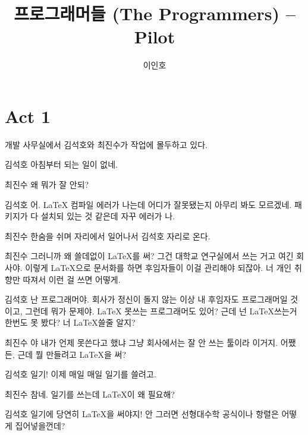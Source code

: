 \documentclass{screenplay}
\title{프로그래머들 (The Programmers) -- Pilot}
\author{이인호}
\begin{document}
    \coverpage
    
    \section{Act 1}
    
    \fadein
    개발 사무실에서 김석호와 최진수가 작업에 몰두하고 있다. 
    \begin{dialogue}[짜증 내는 말투로]{김석호}
        아침부터 되는 일이 없네.
    \end{dialogue}
    \begin{dialogue}{최진수}
        왜 뭐가 잘 안되?
    \end{dialogue}
    \begin{dialogue}{김석호}
        어. LaTeX 컴파일 에러가 나는데 어디가 잘못됐는지 아무리 봐도 모르겠네. 패키지가 다 설치되 있는 것 같은데 자꾸 에러가 나. 
    \end{dialogue}
    최진수 한숨을 쉬며 자리에서 일어나서 김석호 자리로 온다.
    \begin{dialogue}[어이없다는 듯이]{최진수}
        그러니까 왜 쓸데없이 LaTeX를 써? 그건 대학교 연구실에서 쓰는 거고 여긴 회사야. 이렇게 LaTeX으로 문서화를 하면 후임자들이 이걸 관리해야 되잖아. 너 개인 취향만 따져서 이런 걸 쓰면 어떻게. 
    \end{dialogue}
    \begin{dialogue}[반색하며]{김석호}
        난 프로그래머야. 회사가 정신이 돌지 않는 이상 내 후임자도 프로그래머일 것이고, 그런데 뭐가 문제야. LaTeX 못쓰는 프로그래머도 있어?
        근데 넌 LaTeX쓰는거 한번도 못 봤다? 너 LaTeX쓸줄 알지?
    \end{dialogue}
    \begin{dialogue}{최진수}
        야 내가 언제 못쓴다고 했냐 그냥 회사에서는 잘 안 쓰는 툴이라 이거지.
        어쨌든, 근데 뭘 만들려고 LaTeX을 써?
    \end{dialogue}
    \begin{dialogue}[웃으며]{김석호}
        일기! 이제 매일 매일 일기를 쓸려고.
    \end{dialogue}
    \begin{dialogue}[황당하다는 듯이]{최진수}
        참네. 일기를 쓰는데 LaTeX이 왜 필요해?
    \end{dialogue}
    \begin{dialogue}[순진하게]{김석호}
        일기에 당연히 LaTeX을 써야지! 안 그러면 선형대수학 공식이나 항렬은 어떻게 집어넣을껀데?
    \end{dialogue}
\end{document}
